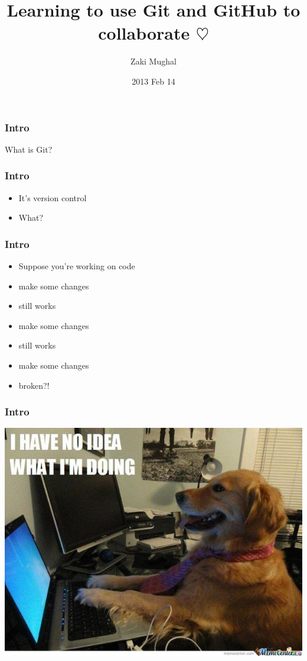 \documentclass[%
        hyperref={%
                pdfauthor={Zakariyya Mughal},%
                pdfpagemode={None},pdfpagelayout={SinglePage}}%
        xcolor={x11names},%
]{beamer}
\title[Git/GitHub]{Learning to use Git and GitHub to collaborate $\heartsuit$}
\author{Zaki Mughal}
\institute{University of Houston:\\CougarCS}
\date{2013 Feb 14}
\begin{document}
\frame{\titlepage}

\begin{frame}
\frametitle{Intro}
\begin{center}
\Huge
What is Git?
\end{center}
\end{frame}

\begin{frame}
\frametitle{Intro}
\begin{itemize}
\item[] It's version control
\pause \item[] What?
\end{itemize}
\end{frame}

\begin{frame}
\frametitle{Intro}
\begin{itemize}
\item[] Suppose you're working on code
\pause \item[] make some changes
\pause \item[] \qquad still works
\pause \item[] make some changes
\pause \item[] \qquad still works
\pause \item[] make some changes
\pause \item[] \qquad broken?!
\end{itemize}
\end{frame}

\begin{frame}
\frametitle{Intro}
\includegraphics[width=\textwidth]{gfx/no-idea.jpg}
\end{frame}
\end{document}
